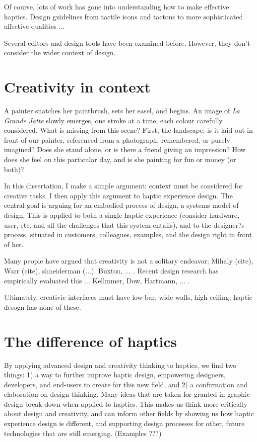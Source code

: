 Of course, lots of work has gone into understanding how to make effective haptics.
Design guidelines from tactile icons and tactons to more sophisticated affective qualities ...

Several editors and design tools have been examined before.
However, they don't consider the wider context of design.




\section{Creativity in context}
A painter snatches her paintbrush, sets her easel, and begins.
An image of \emph{La Grande Jatte} slowly emerges, one stroke at a time, each colour carefully considered.
What is missing from this scene?
First, the landscape: is it laid out in front of our painter, referenced from a photograph, remembered, or purely imagined?
Does she stand alone, or is there a friend giving an impression?
How does she feel on this particular day, and is she painting for fun or money (or both)?

In this dissertation, I make a simple argument: context must be considered for creative tasks. I then apply this argument to haptic experience design.
The central goal is arguing for an embodied process of design, a systems model of design. This is applied to both a single haptic experience (consider hardware, user, etc. and all the challenges that this system entails), and to the designer?s process, situated in customers, colleagues, examples, and the design right in front of her.

Many people have argued that creativity is not a solitary endeavor; Mihaly (cite), Warr (cite), shneiderman (...). Buxton, ... .
Recent design research has empirically evaluated this ... Kellmmer, Dow, Hartmann, ... .

Ultimately, creativie interfaces must have low-bar, wide walls, high ceiling; haptic desogn has none of these.



\section{The difference of haptics}
By applying advanced design and creativity thinking to haptics, we find two things: 
1) a way to further improve haptic design, empowering designers, developers, and end-users to create for this new field, and 
2) a confirmation and elaboration on design thinking.
Many ideas that are taken for granted in graphic design break down when applied to haptics. 
This makes us think more critically about design and creativity, and can inform other fields by showing us how haptic experience design is different, and supporting design processes for other, future technologies that are still emerging. (Examples ???)


